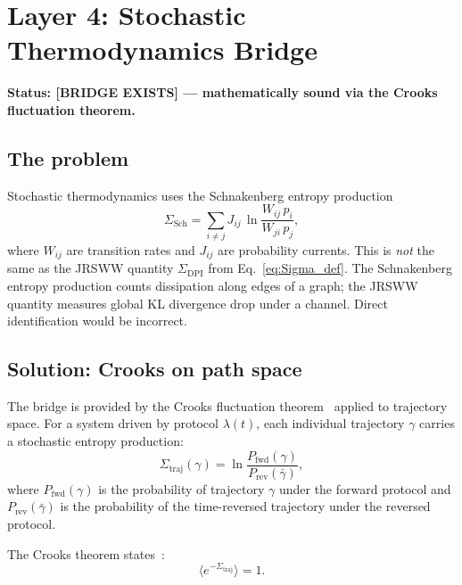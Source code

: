 \documentclass[prl,twocolumn,superscriptaddress,longbibliography,floatfix]{revtex4-2}
\begin{document}
\section{Layer 4: Stochastic Thermodynamics Bridge}
\label{sec:layer4}

\noindent\textbf{Status: [BRIDGE EXISTS] --- mathematically sound
via the Crooks fluctuation theorem.}

\subsection{The problem}

Stochastic thermodynamics uses the Schnakenberg entropy
production~\cite{Schnakenberg1976}
\begin{equation}
\Sigma_{\text{Sch}} = \sum_{i \neq j}
J_{ij}\,\ln\frac{W_{ij}\, p_i}{W_{ji}\, p_j},
\label{eq:Schnakenberg}
\end{equation}
where $W_{ij}$ are transition rates and $J_{ij}$ are probability
currents. This is \emph{not} the same as the JRSWW quantity
$\Sigma_{\text{DPI}}$ from Eq.~\eqref{eq:Sigma_def}. The Schnakenberg
entropy production counts dissipation along edges of a graph; the
JRSWW quantity measures global KL divergence drop under a channel.
Direct identification would be incorrect.

\subsection{Solution: Crooks on path space}

The bridge is provided by the Crooks fluctuation
theorem~\cite{Crooks1999} applied to trajectory space. For a
system driven by protocol $\lambda(t)$, each individual trajectory
$\gamma$ carries a stochastic entropy production:
\begin{equation}
\Sigma_{\text{traj}}(\gamma)
= \ln\frac{P_{\text{fwd}}(\gamma)}{P_{\text{rev}}(\bar{\gamma})},
\label{eq:Sigma_traj}
\end{equation}
where $P_{\text{fwd}}(\gamma)$ is the probability of trajectory
$\gamma$ under the forward protocol and
$P_{\text{rev}}(\bar{\gamma})$ is the probability of the
time-reversed trajectory under the reversed protocol.

The Crooks theorem states~\cite{Crooks1999}:
\begin{equation}
\bigl\langle e^{-\Sigma_{\text{traj}}} \bigr\rangle = 1.
\label{eq:crooks_average}
\end{equation}
\end{document}
